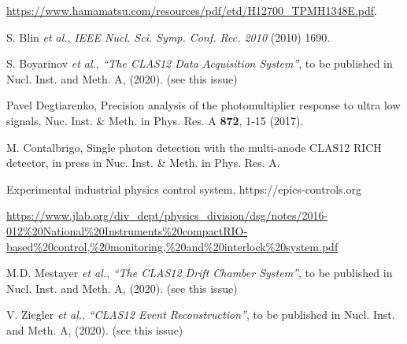 \documentclass[5p,times,twocolumn]{elsarticle}
\def\etal{{\it et al.}}
\begin{document}
\begin{thebibliography}{00}
 \url{https://www.hamamatsu.com/resources/pdf/etd/H12700\_TPMH1348E.pdf}.

 S. Blin \etal, {\em IEEE Nucl. Sci. Symp. Conf. Rec. 2010} (2010) 1690.

S. Boyarinov {\it et al.}, {\it ``The CLAS12 Data Acquisition System''}, to be published in Nucl. Inst.
and Meth. A, (2020). (see this issue)

 Pavel Degtiarenko, Precision analysis of the photomultiplier response to ultra low signals, Nuc. Inst. \& Meth. in Phys. Res. A \textbf{872}, 1-15  (2017).

 M. Contalbrigo, Single photon detection with the multi-anode CLAS12 RICH detector, in press in Nuc. Inst. \& Meth. in Phys. Res. A.

 Experimental industrial physics control system, https://epics-controls.org

 \url{https://www.jlab.org/div_dept/physics_division/dsg/notes/2016-012%20National%20Instruments%20compactRIO-based%20control,%20monitoring,%20and%20interlock%20system.pdf}

M.D. Mestayer {\it et al.}, {\it ``The CLAS12 Drift Chamber System''}, to be published in Nucl. Inst.
and Meth. A, (2020). (see this issue)

V. Ziegler {\it et al.}, {\it ``CLAS12 Event Reconstruction''}, to be published in Nucl. Inst.
and Meth. A, (2020). (see this issue)
  
\end{thebibliography}
\end{document}
